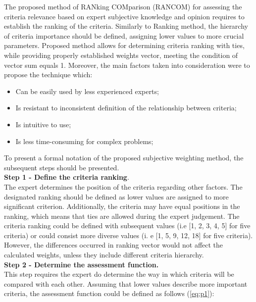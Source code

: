 The proposed method of RANking COMparison (RANCOM) for assessing the criteria relevance based on expert subjective knowledge and opinion requires to establish the ranking of the criteria. Similarly to Ranking method, the hierarchy of criteria importance should be defined, assigning lower values to more crucial parameters. Proposed method allows for determining criteria ranking with ties, while providing properly established weights vector, meeting the condition of vector sum equals 1. Moreover, the main factors taken into consideration were to propose the technique which:

\begin{itemize}
    \item Can be easily used by less experienced experts;
    \item Is resistant to inconsistent definition of the relationship between criteria;
    \item Is intuitive to use;
    \item Is less time-consuming for complex problems;
\end{itemize}

To present a formal notation of the proposed subjective weighting method, the subsequent steps should be presented. \\

\noindent \textbf{Step 1 - Define the criteria ranking}. \\

The expert determines the position of the criteria regarding other factors. The designated ranking should be defined as lower values are assigned to more significant criterion. Additionally, the criteria may have equal positions in the ranking, which means that ties are allowed during the expert judgement. The criteria ranking could be defined with subsequent values (i.e [1, 2, 3, 4, 5] for five criteria) or could consist more diverse values (i. e [1, 5, 9, 12, 18] for five criteria). However, the differences occurred in ranking vector would not affect the calculated weights, unless they include different criteria hierarchy. \\


\noindent \textbf{Step 2 - Determine the assessment function.}  \\

This step requires the expert do determine the way in which criteria will be compared with each other. Assuming that lower values describe more important criteria, the assessment function could be defined as follows (\ref{eq:p1}):


